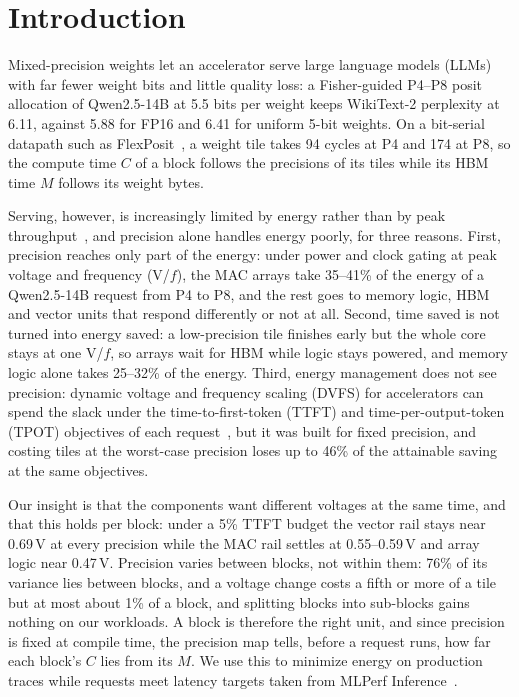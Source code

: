 \section{Introduction}
\label{sec:intro}

Mixed-precision weights let an accelerator serve large language models (LLMs) with far fewer weight bits and little quality loss: a Fisher-guided P4--P8 posit allocation of Qwen2.5-14B at 5.5 bits per weight keeps WikiText-2 perplexity at 6.11, against 5.88 for FP16 and 6.41 for uniform 5-bit weights.
On a bit-serial datapath such as FlexPosit~\cite{gao2026flexposit}, a weight tile takes 94 cycles at P4 and 174 at P8, so the compute time $C$ of a block follows the precisions of its tiles while its HBM time $M$ follows its weight bytes.

Serving, however, is increasingly limited by energy rather than by peak throughput~\cite{iea2025energyai,tpuv4:isca23}, and precision alone handles energy poorly, for three reasons.
First, precision reaches only part of the energy: under power and clock gating at peak voltage and frequency (V/$f$), the MAC arrays take 35--41\% of the energy of a Qwen2.5-14B request from P4 to P8, and the rest goes to memory logic, HBM and vector units that respond differently or not at all.
Second, time saved is not turned into energy saved: a low-precision tile finishes early but the whole core stays at one V/$f$, so arrays wait for HBM while logic stays powered, and memory logic alone takes 25--32\% of the energy.
Third, energy management does not see precision: dynamic voltage and frequency scaling (DVFS) for accelerators can spend the slack under the time-to-first-token (TTFT) and time-per-output-token (TPOT) objectives of each request~\cite{ascend_dvfs:asplos25,xue2026finedvfs}, but it was built for fixed precision, and costing tiles at the worst-case precision loses up to 46\% of the attainable saving at the same objectives.

Our insight is that the components want different voltages at the same time, and that this holds per block: under a 5\% TTFT budget the vector rail stays near 0.69\,V at every precision while the MAC rail settles at 0.55--0.59\,V and array logic near 0.47\,V. Precision varies between blocks, not within them: 76\% of its variance lies between blocks, and a voltage change costs a fifth or more of a tile but at most about 1\% of a block, and splitting blocks into sub-blocks gains nothing on our workloads.
A block is therefore the right unit, and since precision is fixed at compile time, the precision map tells, before a request runs, how far each block's $C$ lies from its $M$.
We use this to minimize energy on production traces while requests meet latency targets taken from MLPerf Inference~\cite{mlperf_llama31,mlperf_llama270b}.

